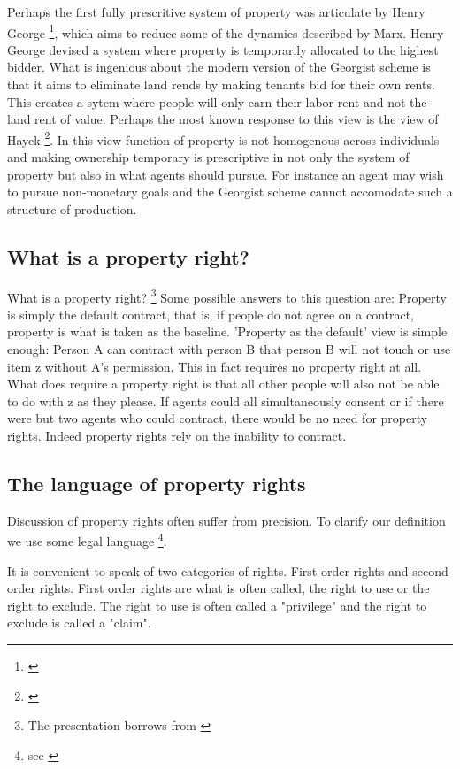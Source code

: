 \documentclass[12pt]{article}
\numberwithin{equation}{section}
\begin{document}
Perhaps the first fully prescritive system of property was articulate by Henry George \footnote{\cite{progress}}, which aims to reduce some of the dynamics described by Marx. Henry George devised a system where property is temporarily allocated to the highest bidder. What is ingenious about the modern version of the Georgist scheme is that it aims to eliminate land rends by making tenants bid for their own rents. This creates a sytem where people will only earn their labor rent and not the land rent of value. Perhaps the most known response to this view is the view of Hayek \footnote{\cite{Fatal}}. In this view function of property is not homogenous across individuals and making ownership temporary is prescriptive in not only the system of property but also in what agents should pursue. For instance an agent may wish to pursue non-monetary goals and the Georgist scheme cannot accomodate such a structure of production.


\newpage


\subsection{What is a property right?}

What is a property right? \footnote{The presentation borrows from \cite{Munzer1990}}
Some possible answers to this question are: Property is simply the default contract, that is, if people do not agree on a contract, property is what is taken as the baseline. 'Property as the default' view is simple enough: Person A can contract with person B that person B will not touch or use item z without A's permission. This in fact requires no property right at all. What does require a property right is that all other people will also not be able to do with z as they please. If agents could all simultaneously consent or if there were but two agents who could contract, there would be no need for property rights. Indeed property rights rely on the inability to contract. 



\subsection{The language of property rights}

Discussion of property rights often suffer from precision. To clarify our definition we use some legal language \footnote{see \cite{Hohfeld}}. 

It is convenient to speak of two categories of rights. First order rights and second order rights. First order rights are what is often called, the right to use or the right to exclude. The right to use is often called a "privilege" and the right to exclude is called a "claim". 
\end{document}
